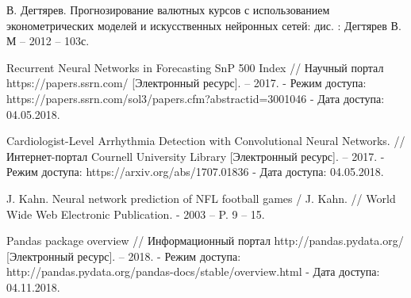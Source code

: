 \newpage
\begin{thebibliography}{3}
	В. Дегтярев. Прогнозирование валютных курсов с использованием эконометрических моделей и искусственных нейронных сетей: дис. : Дегтярев В. М – 2012 – 103с.
	
	Recurrent Neural Networks in Forecasting SnP 500 Index // Научный портал https://papers.ssrn.com/ [Электронный ресурс]. – 2017. - Режим доступа: https://papers.ssrn.com/sol3/papers.cfm?abstractid=3001046 - Дата доступа: 04.05.2018.
	
	Cardiologist-Level Arrhythmia Detection with Convolutional Neural Networks. // Интернет-портал Cournell University Library [Электронный ресурс]. – 2017. - Режим доступа: https://arxiv.org/abs/1707.01836 - Дата доступа: 04.05.2018.
	
	J. Kahn. Neural network prediction of NFL football games / J. Kahn. // World Wide Web Electronic Publication. -  2003 – P. 9 – 15.
	
	 Pandas package overview // Информационный портал http://pandas.pydata.org/ [Электронный ресурс]. – 2018. - Режим доступа: http://pandas.pydata.org/pandas-docs/stable/overview.html - Дата доступа: 04.11.2018.
	
\end{thebibliography}